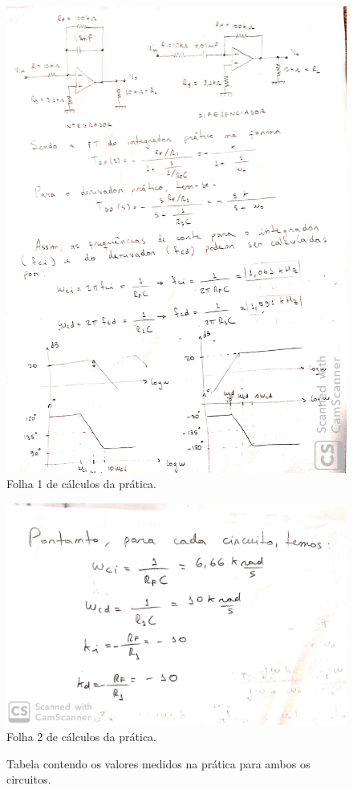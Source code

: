 \begin{figure}[H] 
\includegraphics[scale=0.22]{imagens/calc1.jpg} 
\centering
\caption{Folha 1 de cálculos da prática.}
\label{p5-2} 
\end{figure} 

\begin{figure}[H] 
\includegraphics[scale=0.15]{imagens/calc2.jpg} 
\centering
\caption{Folha 2 de cálculos da prática.}
\label{p5-2} 
\end{figure} 

\newpage
\begin{figure}[h!]
	\centering
		 
	\caption{Tabela contendo os valores medidos na prática para ambos os circuitos.}
	\label{table}
\end{figure}











